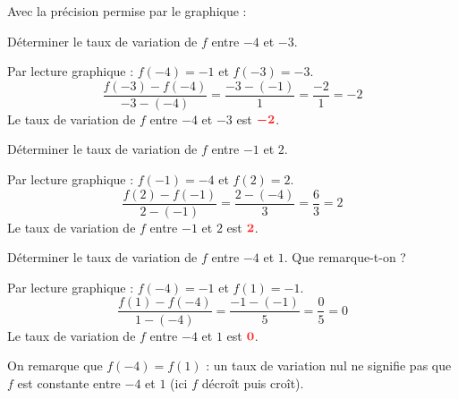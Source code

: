 \documentclass[11pt,a4paper]{article}  %
\begin{document}
Avec la précision permise par le graphique :

\begin{enumMet}
	\item Déterminer le taux de variation de $f$ entre $-4$ et $-3$.

	\begin{corrBox}
		Par lecture graphique : $f(-4)=-1$ et $f(-3)=-3$.
		\[\dfrac{f(-3)-f(-4)}{-3-(-4)}=\dfrac{-3-(-1)}{1}=\dfrac{-2}{1}=-2\]
		Le taux de variation de $f$ entre $-4$ et $-3$ est $\mRouge{-2}$.
	\end{corrBox}

	\item Déterminer le taux de variation de $f$ entre $-1$ et $2$.

	\begin{corrBox}
		Par lecture graphique : $f(-1)=-4$ et $f(2)=2$.
		\[\dfrac{f(2)-f(-1)}{2-(-1)}=\dfrac{2-(-4)}{3}=\dfrac{6}{3}=2\]
		Le taux de variation de $f$ entre $-1$ et $2$ est $\mRouge{2}$.
	\end{corrBox}

	\item Déterminer le taux de variation de $f$ entre $-4$ et $1$. Que remarque-t-on ?

	\begin{corrBox}
		Par lecture graphique : $f(-4)=-1$ et $f(1)=-1$.
		\[\dfrac{f(1)-f(-4)}{1-(-4)}=\dfrac{-1-(-1)}{5}=\dfrac{0}{5}=0\]
		Le taux de variation de $f$ entre $-4$ et $1$ est $\mRouge{0}$.

		On remarque que $f(-4)=f(1)$ : un taux de variation nul ne signifie pas que $f$ est constante entre $-4$ et $1$ (ici $f$ décroît puis croît).
	\end{corrBox}
\end{enumMet}
\end{document}
